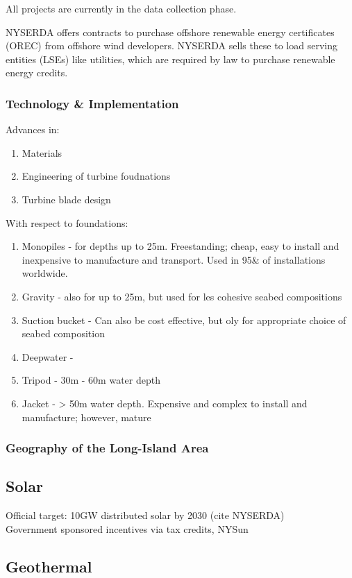 \documentclass[plain]{article}
\newcommand{\1}{\mathbbm{1}}
\begin{document}
All projects are currently in the data collection phase. \cite{noauthor_new_nodate-1}

NYSERDA offers contracts to purchase offshore renewable energy certificates (OREC) from offshore wind developers. NYSERDA sells these to load serving entities (LSEs) like utilities, which are required by law to purchase renewable energy credits. \cite{NYSERDA_new_nodate-1}

\subsubsection{Technology \& Implementation}
Advances in:
\begin{enumerate}
	\item Materials
	\item Engineering of turbine foudnations
	\item Turbine blade design
\end{enumerate}

With respect to foundations: \cite{mitchell_review_2022}
\begin{enumerate}
	\item Monopiles - for depths up to 25m. Freestanding; cheap, easy to install and inexpensive to manufacture and transport. Used in 95\& of installations worldwide.
	\item Gravity - also for up to 25m, but used for les cohesive seabed compositions
	\item Suction bucket - Can also be cost effective, but oly for appropriate choice of seabed composition
	\item Deepwater - 
	\item Tripod - 30m - 60m water depth
	\item Jacket - > 50m water depth. Expensive and complex to install and manufacture; however, mature
\end{enumerate}
\subsubsection{Geography of the Long-Island Area}

\subsection{Solar}
Official target: 10GW distributed solar by 2030 (cite NYSERDA)\\
Government sponsored incentives via tax credits, NYSun

\subsection{Geothermal}
\end{document}
